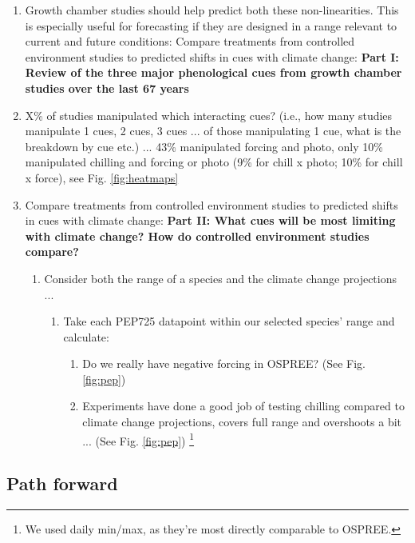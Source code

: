 \documentclass[11pt,letter]{article}
\begin{document}





\begin{enumerate}
\item Growth chamber studies should help predict both these non-linearities. This is especially useful for forecasting if they are designed in a range relevant to current and future conditions: Compare treatments from controlled environment studies to predicted shifts in cues with climate change: {\bf Part I: Review of the three major phenological cues from growth chamber studies over the last 67 years} %
\item X\% of studies manipulated which interacting cues? (i.e., how many studies manipulate 1 cues, 2 cues, 3 cues ... of those manipulating 1 cue, what is the breakdown by cue etc.) ... 43\% manipulated forcing and photo, only 10\% manipulated chilling and forcing or photo (9\% for chill x photo; 10\% for chill x force), see Fig. \ref{fig:heatmaps}
\item Compare treatments from controlled environment studies to predicted shifts in cues with climate change: {\bf Part II: What cues will be most limiting with climate change? How do controlled environment studies compare?}
\begin{enumerate}
\item Consider both the range of a species and the climate change projections ...
\begin{enumerate}
\item Take each PEP725 datapoint within our selected species' range and calculate:
\begin{enumerate}
\item Do we really have negative forcing in OSPREE? (See Fig. \ref{fig:pep})
\item Experiments have done a good job of testing chilling compared to climate change projections, covers full range and overshoots a bit ... (See Fig. \ref{fig:pep}) \footnote{We used daily min/max, as they're most directly comparable to OSPREE.}
\end{enumerate}
\end{enumerate}
\end{enumerate}
\end{enumerate}

\subsection{Path forward}
\end{document}
